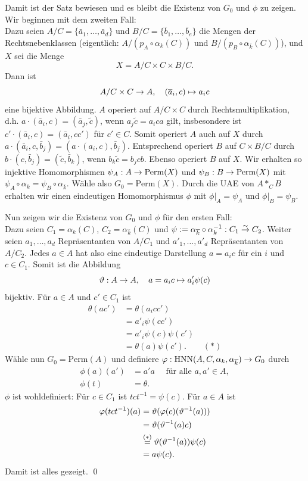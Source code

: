 \documentclass[a4paper, 12pt, twoside]{article}
\begin{document}
Damit ist der Satz bewiesen und es bleibt die Existenz von $G_0$
und $\phi$ zu zeigen. Wir beginnen mit dem zweiten Fall:\\
Dazu seien $A/C=\{\bar{a}_1,\ldots,\bar{a}_d\}$ und
$B/C=\{\bar{b}_1,\ldots,\bar{b}_e\}$ die Mengen der Rechtsnebenklassen
(eigentlich: $A/(p_A\circ\alpha_k(C))$ und
$B/(p_B\circ\alpha_{\bar{k}}(C))$), und $X$ sei die Menge
\[
X = A/C \times C \times B/C.
\]
Dann ist
\[
A/C \times C \Ra A, \quad (\bar{a}_i,c)\mapsto a_i c
\]
eine bijektive Abbildung. $A$ operiert auf $A/C\times C$ durch
Rechtsmultiplikation,
d.h. $a\cdot(\bar{a}_i,c)=(\bar{a}_j,\tilde{c})$, wenn
$a_j\tilde{c}=a_i c a$ gilt, insbesondere ist
$c'\cdot(\bar{a}_i,c)=(\bar{a}_i,cc')$ für $c'\in C$.
Somit operiert $A$ auch auf $X$ durch
$a\cdot(\bar{a}_i,c,\bar{b}_j)=(a\cdot(a_i,c),\bar{b}_j)$.
Entsprechend operiert $B$ auf $C\times B/C$ durch
$b\cdot(c,\bar{b}_j)=(\tilde{c},\bar{b}_k)$, wenn
$b_k\tilde{c}=b_j c b$. Ebenso operiert $B$ auf $X$.
Wir erhalten so injektive Homomorphismen
$\psi_A:A\Ra\mathrm{Perm}(X)$ und $\psi_B:B\Ra\mathrm{Perm}(X)$ mit
$\psi_A\circ\alpha_k=\psi_B\circ\alpha_{\bar{k}}$.
Wähle also $G_0=\mathrm{Perm}(X)$. Durch die UAE von $A*_C B$
erhalten wir einen eindeutigen Homomorphismus $\phi$ mit
$\phi|_A=\psi_A$ und $\phi|_B=\psi_B$.

Nun zeigen wir die Existenz von $G_0$ und $\phi$ für den ersten
Fall:\\
Dazu seien $C_1=\alpha_k(C)$, $C_2=\alpha_{\bar{k}}(C)$ und
$\psi:=\alpha_{\bar{k}}\circ\alpha_k^{-1}:C_1\os{\Ra}{\sim} C_2$.
Weiter seien $a_1,\ldots,a_d$ Repräsentanten von $A/C_1$ und
$a'_1,\ldots,a'_d$ Repräsentanten von $A/C_2$. Jedes $a\in A$ hat
also eine eindeutige Darstellung $a=a_i c$ für ein $i$ und $c\in C_1$.
Somit ist die Abbildung
\[
\theta:A\Ra A,\quad a=a_i c \mapsto a_i' \psi(c)
\]
bijektiv.
Für $a\in A$ und $c'\in C_1$ ist
\begin{align*}
\theta(ac') &= \theta(a_i c c') \\
&= a'_i \psi(cc') \\
&= a'_i \psi(c)\psi(c') \\
&= \theta(a)\psi(c'). \qquad (*)
\end{align*}
Wähle nun $G_0=\mathrm{Perm}(A)$ und definiere
$\phi:\HNN(A,C,\alpha_k,\alpha_{\bar{k}})\Ra G_0$ durch
\begin{align*}
\phi(a)(a')&=a' a\quad \text{ für alle } a,a'\in A, \\
\phi(t)&=\theta.
\end{align*}
$\phi$ ist wohldefiniert: Für $c\in C_1$ ist $tct^{-1}=\psi(c)$.
Für $a\in A$ ist
\begin{align*}
\phi(tct^{-1})(a) &= \theta(\phi(c)(\theta^{-1}(a))) \\
&= \theta(\theta^{-1}(a)c) \\
&\os{=}{(*)} \theta(\theta^{-1}(a)) \psi(c) \\
&= a \psi(c).
\end{align*}
Damit ist alles gezeigt.
\qed
\end{document}
